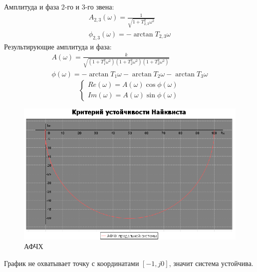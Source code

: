 \documentclass[12pt]{article}
\begin{document}
Амплитуда и фаза 2-го и 3-го звена:
\begin{equation}
    \begin{gathered}
     A_{2,3}(\omega) = \frac{1}{\sqrt{1 + T_{2,3}^2\omega^2}} \\
    \phi_{2,3}(\omega) = - \arctan{T_{2,3}\omega} 
    \end{gathered}
\end{equation}
Результирующие амплитуда и фаза: 
\begin{equation}
    \begin{gathered}
        A(\omega) = \frac{k}{\sqrt{(1 + T_1^2\omega^2)(1 + T_2^2\omega^2)(1 + T_3^2\omega^2)}} \\
        \phi(\omega) = -\arctan{T_1\omega} - \arctan{T_2\omega} - \arctan{T_3\omega} 
    \end{gathered}
\end{equation}
\begin{equation}
    \begin{cases}
        Re(\omega) = A(\omega)\cos{\phi(\omega)} \\
        Im(\omega) = A(\omega)\sin{\phi(\omega)} 
    \end{cases}
\end{equation}

\begin{figure}[h!]
     \centering
    \includegraphics[width = \linewidth]{АФЧХ.png}
    \caption{АФЧХ}
\end{figure} 
График не охватывает точку с координатами $[-1, j0]$, значит система устойчива. 
\newpage
\end{document}
